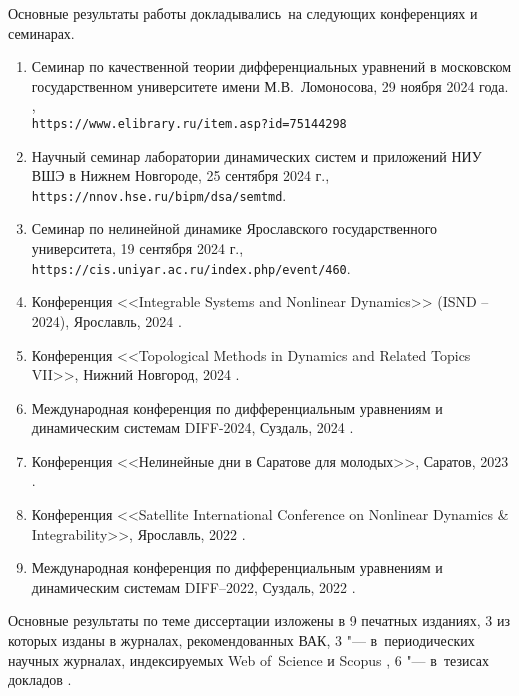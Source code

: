 {\probation}
Основные результаты работы докладывались~на следующих конференциях и семинарах.
\begin{enumerate}
	\item Семинар по качественной теории дифференциальных уравнений в московском государственном университете имени М.В.~Ломоносова, 29 ноября 2024 года. \cite{Sergeev2024},\\\texttt{https://www.elibrary.ru/item.asp?id=75144298}
	\item Научный семинар лаборатории динамических систем и приложений НИУ ВШЭ в Нижнем Новгороде, 25 сентября 2024 г.,\\\texttt{https://nnov.hse.ru/bipm/dsa/semtmd}.
	\item Семинар по нелинейной динамике Ярославского государственного университета, 19 сентября 2024 г.,\\\texttt{https://cis.uniyar.ac.ru/index.php/event/460}.
	\item Конференция <<Integrable Systems and Nonlinear Dynamics>> (ISND – 2024), Ярославль, 2024 \cite{confbib5}.
	\item Конференция <<Topological Methods in Dynamics and Related Topics VII>>, Нижний Новгород, 2024 \cite{confbib6}.
	\item Международная конференция по дифференциальным уравнениям и динамическим системам DIFF-2024, Суздаль, 2024 \cite{confbib3}.
	\item Конференция <<Нелинейные дни в Саратове для молодых>>, Саратов, 2023 \cite{confbib2}.
	\item Конференция <<Satellite International Conference on Nonlinear Dynamics {\&} Integrability>>, Ярославль, 2022 \cite{confbib4}.
	\item Международная конференция по дифференциальным уравнениям и динамическим системам DIFF--2022, Суздаль, 2022 \cite{confbib1}.
\end{enumerate}



{\publications} Основные результаты по теме диссертации изложены в 9 печатных изданиях, 3 из которых \cite{wosbib1,wosbib2,scbib1} изданы в журналах, рекомендованных ВАК, 3 "--- в~периодических научных журналах, индексируемых Web of~Science и Scopus \cite{wosbib1,wosbib2,scbib1}, 6 "--- в~тезисах докладов \cite{confbib1,confbib2,confbib3,confbib4,confbib5,confbib6}.

